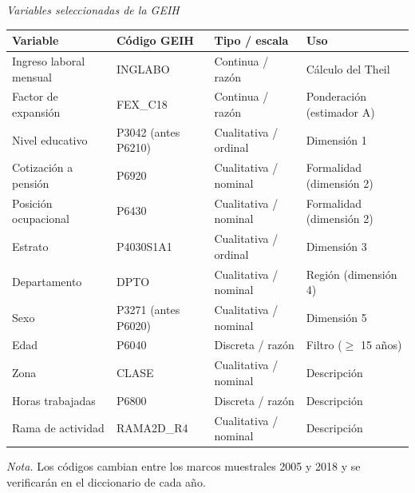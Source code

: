 \documentclass[12pt,letterpaper]{article}
\providecommand{\DIFdelbegin}{}\providecommand{\DIFdelend}{} %
\begin{document}
\DIFdelbegin
\begin{table}[H]
  \singlespacing
  \raggedright
  \color{RED}{\bfseries Tabla 1 --- versión anterior\par}
  \vspace{0.5\baselineskip}
  {\itshape Variables seleccionadas de la GEIH\par}
  \vspace{0.5\baselineskip}
  \small
  \renewcommand{\arraystretch}{1.35}
  \begin{tabular}{@{}>{\raggedright\arraybackslash}p{1.45in}
                    >{\raggedright\arraybackslash}p{1.35in}
                    >{\raggedright\arraybackslash}p{1.45in}
                    >{\raggedright\arraybackslash}p{1.65in}@{}}
    \toprule
    Variable & Código GEIH & Tipo / escala & Uso \\
    \midrule
    Ingreso laboral mensual & INGLABO & Continua / razón & Cálculo del Theil \\
    Factor de expansión & FEX\_C18 & Continua / razón & Ponderación (estimador A) \\
    Nivel educativo & P3042 (antes P6210) & Cualitativa / ordinal & Dimensión 1 \\
    Cotización a pensión & P6920 & Cualitativa / nominal & Formalidad (dimensión 2) \\
    Posición ocupacional & P6430 & Cualitativa / nominal & Formalidad (dimensión 2) \\
    Estrato & P4030S1A1 & Cualitativa / ordinal & Dimensión 3 \\
    Departamento & DPTO & Cualitativa / nominal & Región (dimensión 4) \\
    Sexo & P3271 (antes P6020) & Cualitativa / nominal & Dimensión 5 \\
    Edad & P6040 & Discreta / razón & Filtro ($\geq$ 15 años) \\
    Zona & CLASE & Cualitativa / nominal & Descripción \\
    Horas trabajadas & P6800 & Discreta / razón & Descripción \\
    Rama de actividad & RAMA2D\_R4 & Cualitativa / nominal & Descripción \\
    \bottomrule
  \end{tabular}


  \vspace{0.3\baselineskip}
  {\itshape Nota.} Los códigos cambian entre los marcos muestrales 2005 y 2018 y se verificarán en el diccionario de cada año.
\end{table}
\end{document}
